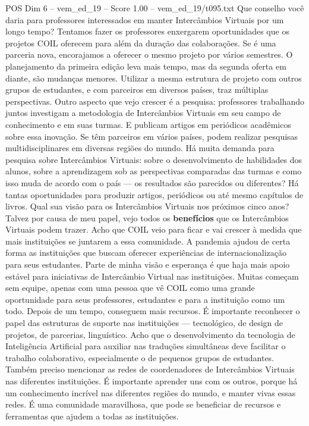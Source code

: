 \begin{textsample}{POS Dim 6 – vem\_ed\_19 – Score 1.00 – vem\_ed\_19/t095.txt}
Que conselho você daria para professores interessados em manter Intercâmbios Virtuais por um longo tempo?
Tentamos fazer os professores enxergarem oportunidades que os projetos COIL oferecem para além da duração das colaborações.
Se é uma parceria nova, encorajamos a oferecer o mesmo projeto por vários semestres.
O planejamento da primeira edição leva mais tempo, mas da segunda oferta em diante, são mudanças menores.
Utilizar a mesma estrutura de projeto com outros grupos de estudantes, e com parceiros em diversos países, traz múltiplas perspectivas.
Outro aspecto que vejo crescer é a pesquisa: professores trabalhando juntos investigam a metodologia de Intercâmbios Virtuais em seu campo de conhecimento e em suas turmas.
E publicam artigos em periódicos acadêmicos sobre essa inovação.
Se têm parceiros em vários países, podem realizar pesquisas multidisciplinares em diversas regiões do mundo.
Há muita demanda para pesquisa sobre Intercâmbios Virtuais: sobre o desenvolvimento de habilidades dos alunos, sobre a aprendizagem sob as perspectivas comparadas das turmas e como isso muda de acordo com o país — os resultados são parecidos ou diferentes?
Há tantas oportunidades para produzir artigos, periódicos ou até mesmo capítulos de livros.
Qual sua visão para os Intercâmbios Virtuais nos próximos cinco anos?
Talvez por causa de meu papel, vejo todos os \textbf{benefícios} que os Intercâmbios Virtuais podem trazer.
Acho que COIL veio para ficar e vai crescer à medida que mais instituições se juntarem a essa comunidade.
A pandemia ajudou de certa forma as instituições que buscam oferecer experiências de internacionalização para seus estudantes.
Parte de minha visão e esperança é que haja mais apoio estável para iniciativas de Intercâmbio Virtual nas instituições.
Muitas começam sem equipe, apenas com uma pessoa que vê COIL como uma grande oportunidade para seus professores, estudantes e para a instituição como um todo.
Depois de um tempo, conseguem mais recursos.
É importante reconhecer o papel das estruturas de suporte nas instituições — tecnológico, de design de projetos, de parcerias, linguístico.
Acho que o desenvolvimento da tecnologia de Inteligência Artificial para auxiliar nas traduções simultâneas deve facilitar o trabalho colaborativo, especialmente o de pequenos grupos de estudantes.
Também preciso mencionar as redes de coordenadores de Intercâmbios Virtuais nas diferentes instituições.
É importante aprender uns com os outros, porque há um conhecimento incrível nas diferentes regiões do mundo, e manter vivas essas redes.
É uma comunidade maravilhosa, que pode se beneficiar de recursos e ferramentas que ajudem a todas as instituições.

\end{textsample}
